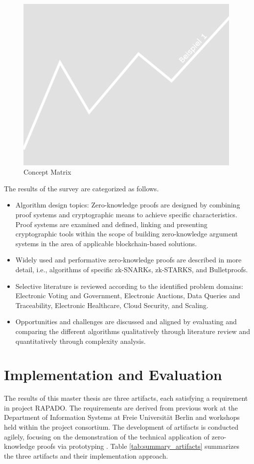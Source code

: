 \begin{figure}[hbt]
	\centering
		\includegraphics[width=0.99\textwidth]{Pictures/bsp1.png}
	\caption{Concept Matrix}
	\label{fig:concept_matrix}
\end{figure}

The results of the survey are categorized as follows. 
\begin{itemize}
    \item Algorithm design topics: Zero-knowledge proofs are designed by combining proof systems and cryptographic means to achieve specific characteristics. Proof systems are examined and defined, linking and presenting cryptographic tools within the scope of building zero-knowledge argument systems in the area of applicable blockchain-based solutions.
    \item Widely used and performative zero-knowledge proofs are described in more detail, i.e., algorithms of specific zk-SNARKs, zk-STARKS, and Bulletproofs.
    \item Selective literature is reviewed according to the identified problem domains: Electronic Voting and Government, Electronic Auctions, Data Queries and Traceability, Electronic Healthcare, Cloud Security, and Scaling.
    \item Opportunities and challenges are discussed and aligned by evaluating and comparing the different algorithms qualitatively through literature review and quantitatively through complexity analysis.
\end{itemize}

\section{Implementation and Evaluation}
The results of this master thesis are three artifacts, each satisfying a requirement in project RAPADO. The requirements are derived from previous work at the Department of Information Systems at Freie Universit{\"a}t Berlin and workshops held within the project consortium. The development of artifacts is conducted agilely, focusing on the demonstration of the technical application of zero-knowledge proofs via prototyping \citep{mci/Wilde2007}. Table \ref{tab:summary_artifacts} summarizes the three artifacts and their implementation approach.

